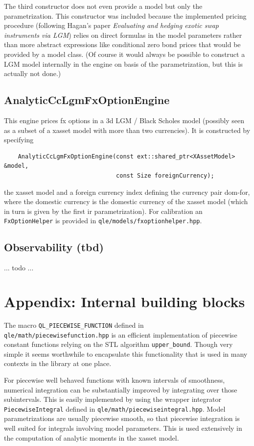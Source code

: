 \documentclass[12pt, a4paper]{article}
\begin{document}
The third constructor does not even provide a model but only the parametrization. This constructor was included because the implemented pricing procedure (following Hagan's paper \textit{Evaluating and hedging exotic swap instruments via LGM}) relies on direct formulas in the model parameters rather than more abstract expressions like conditional zero bond prices that would be provided by a model class. (Of course it would always be possible to construct a LGM model internally in the engine on basis of the parametrization, but this is actually not done.)

\subsection{AnalyticCcLgmFxOptionEngine}

This engine prices fx options in a 3d LGM / Black Scholes model (possibly seen as a subset of a xasset model with more than two currencies). It is constructed by specifying

\medskip
\scriptsize
\begin{verbatim}
    AnalyticCcLgmFxOptionEngine(const ext::shared_ptr<XAssetModel> &model,
                                const Size foreignCurrency);
\end{verbatim}
\normalsize
\medskip

the xasset model and a foreign currency index defining the currency pair dom-for, where the domestic currency is the domestic currency of the xasset model (which in turn is given by the first ir parametrization). For calibration an \verb+FxOptionHelper+ is provided in \verb+qle/models/fxoptionhelper.hpp+.

\subsection{Observability (tbd)}

... todo ...

\section{Appendix: Internal building blocks}

The macro \verb+QL_PIECEWISE_FUNCTION+ defined in \verb+qle/math/piecewisefunction.hpp+ is an efficient implementation of piecewise constant functions relying on the STL algorithm \verb+upper_bound+. Though very simple it seems worthwhile to encapsulate this functionality that is used in many contexts in the library at one place.

For piecewise well behaved functions with known intervals of smoothness, numerical integration can be substantially improved by integrating over those subintervals. This is easily implemented by using the wrapper integrator \verb+PiecewiseIntegral+ defined in \verb+qle/math/piecewiseintegral.hpp+. Model parametrizations are usually piecewise smooth, so that piecewise integration is well suited for integrals involving model parameters. This is used extensively in the computation of analytic moments in the xasset model.
\end{document}
